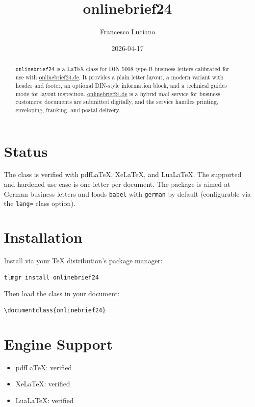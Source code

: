 \documentclass[a4paper,11pt]{article}
\title{onlinebrief24}
\author{Francesco Luciano}
\date{2026-04-17}
\begin{document}
\maketitle

\begin{abstract}
\texttt{onlinebrief24} is a LaTeX class for DIN 5008 type-B
business letters calibrated for use with \href{https://onlinebrief24.de}
{onlinebrief24.de}. It provides a plain letter layout, a modern variant with
header and footer, an optional DIN-style information block, and a technical
guides mode for layout inspection.
\href{https://onlinebrief24.de}{onlinebrief24.de} is a hybrid mail service for
business customers: documents are submitted digitally, and the service handles
printing, enveloping, franking, and postal delivery.
\end{abstract}

\section{Status}

The class is verified with pdfLaTeX, XeLaTeX, and LuaLaTeX. The supported and
hardened use case is one letter per document. The package is aimed at German
business letters and loads \texttt{babel} with \texttt{german} by default
(configurable via the \texttt{lang=} class option).

\section{Installation}

Install via your TeX distribution's package manager:

\begin{Verbatim}[fontsize=\small]
tlmgr install onlinebrief24
\end{Verbatim}

Then load the class in your document:

\begin{Verbatim}[fontsize=\small]
\documentclass{onlinebrief24}
\end{Verbatim}

\section{Engine Support}

\begin{itemize}
\item pdfLaTeX: verified
\item XeLaTeX: verified
\item LuaLaTeX: verified
\end{itemize}
\end{document}
